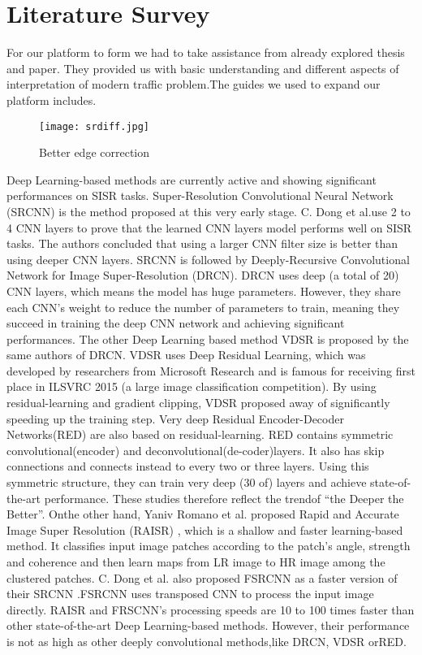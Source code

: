 \chapter{Literature Survey}

For our platform to form we had to take assistance from already explored thesis and paper. They provided us with basic understanding and different aspects of interpretation of modern traffic problem.The guides we used to expand our platform includes.

\begin{figure}[htb]
    \centering
    \texttt{[image: srdiff.jpg]}
    \caption{Better edge correction}
    \label{fig:srdiff} %
\end{figure}

Deep Learning-based methods are currently active and showing significant performances on SISR tasks. Super-Resolution Convolutional Neural Network (SRCNN) is the method proposed at this very early stage. C. Dong et al.use 2 to 4 CNN layers to prove that the learned CNN layers model performs well on SISR tasks. The authors concluded that using a larger CNN filter size is better than using deeper CNN layers. SRCNN is followed by Deeply-Recursive Convolutional Network for Image Super-Resolution (DRCN). DRCN uses deep (a total of 20) CNN layers, which means the model has huge parameters. However, they share each CNN’s weight to reduce the number of parameters to train, meaning they succeed in training the deep CNN network and achieving significant performances. The other Deep Learning based method VDSR is proposed by the same authors of DRCN. VDSR uses Deep Residual Learning, which was developed by researchers from Microsoft Research and is famous for receiving first place in ILSVRC 2015 (a large image classification competition). By using residual-learning and gradient clipping, VDSR proposed away of significantly speeding up the training step. Very deep Residual Encoder-Decoder Networks(RED) are also based on residual-learning. RED contains symmetric convolutional(encoder) and deconvolutional(de-coder)layers. It also has skip connections and connects instead to every two or three layers. Using this symmetric structure, they can train very deep (30 of) layers and achieve state-of-the-art performance. These studies therefore reflect the trendof “the Deeper the Better”. Onthe other hand, Yaniv Romano et al. proposed Rapid and Accurate Image Super Resolution (RAISR) , which is a shallow and faster learning-based method. It classifies input image patches according to the patch’s angle, strength and coherence and then learn maps from LR image to HR image among the clustered patches. C. Dong et al. also proposed FSRCNN as a faster version of their SRCNN .FSRCNN uses transposed CNN to process the input image directly. RAISR and FRSCNN’s processing speeds are 10 to 100 times faster than other state-of-the-art Deep Learning-based methods. However, their performance is not as high as other deeply convolutional methods,like DRCN, VDSR orRED.

